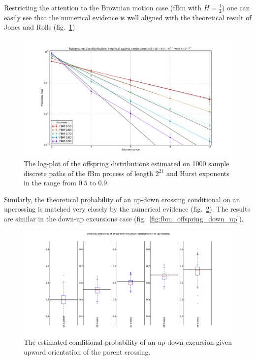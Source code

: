 \documentclass[a4paper]{article}
\begin{document}
Restricting the attention to the Brownian motion case (fBm with $H=\tfrac{1}{2}$)
one can easily see that the numerical evidence is well aligned with the theoretical
result of Jones and Rolls (fig.~\ref{fig:fbm_offspring_distribution}).
\begin{figure}[htb]\begin{center}
    \includegraphics[width=6in]{images/fbm_fig_01_med_1000-21}
    \caption{The log-plot of the offspring distributions estimated on 1000 sample discrete paths
    of the fBm process of length $2^{21}$ and Hurst exponents in the range from $0.5$ to $0.9$.}
\label{fig:fbm_offspring_distribution}
\end{center}\end{figure}
Similarly, the theoretical probability of an up-down crossing conditional on an upcrossing
is matched very closely by the numerical evidence (fig.~\ref{fig:fbm_offspring_up_down}).
The results are similar in the down-up excursions case (fig.~\ref{fig:fbm_offspring_down_up}).

\begin{figure}[htb]\begin{center}
    \includegraphics[width=6in]{images/fbm_fig_03_up-down_med_1000-21}
    \caption{The estimated conditional probability of an up-down excursion given upward
    orientation of the parent crossing.}
\label{fig:fbm_offspring_up_down}
\end{center}\end{figure}
\end{document}
